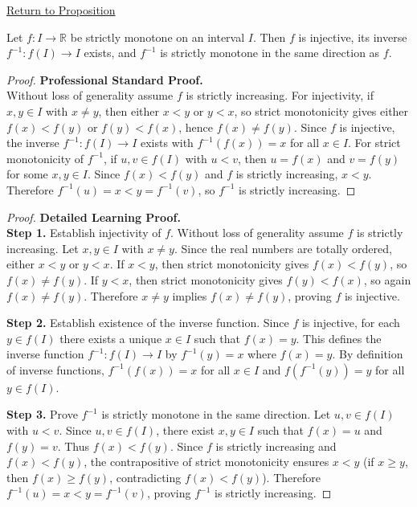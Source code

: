 \newpage
{}
\label{prf:inverse-strictly-monotone}

\begin{remark*}[Return]
\hyperref[prop:inverse-strictly-monotone]{Return to Proposition}
\end{remark*}

\begin{theorem*}
Let $f : I \to \mathbb{R}$ be strictly monotone on an interval $I$. Then $f$ is injective, its inverse $f^{-1} : f(I) \to I$ exists, and $f^{-1}$ is strictly monotone in the same direction as $f$.
\end{theorem*}

\begin{proof}
\textbf{Professional Standard Proof.}~\\
Without loss of generality assume $f$ is strictly increasing. For injectivity, if $x, y \in I$ with $x \neq y$, then either $x < y$ or $y < x$, so strict monotonicity gives either $f(x) < f(y)$ or $f(y) < f(x)$, hence $f(x) \neq f(y)$. Since $f$ is injective, the inverse $f^{-1} : f(I) \to I$ exists with $f^{-1}(f(x)) = x$ for all $x \in I$. For strict monotonicity of $f^{-1}$, if $u, v \in f(I)$ with $u < v$, then $u = f(x)$ and $v = f(y)$ for some $x, y \in I$. Since $f(x) < f(y)$ and $f$ is strictly increasing, $x < y$. Therefore $f^{-1}(u) = x < y = f^{-1}(v)$, so $f^{-1}$ is strictly increasing.
\end{proof}

\begin{proof}
\textbf{Detailed Learning Proof.}~\\

\textbf{Step 1.} Establish injectivity of $f$.
Without loss of generality assume $f$ is strictly increasing. Let $x, y \in I$ with $x \neq y$. Since the real numbers are totally ordered, either $x < y$ or $y < x$. If $x < y$, then strict monotonicity gives $f(x) < f(y)$, so $f(x) \neq f(y)$. If $y < x$, then strict monotonicity gives $f(y) < f(x)$, so again $f(x) \neq f(y)$. Therefore $x \neq y$ implies $f(x) \neq f(y)$, proving $f$ is injective.

\textbf{Step 2.} Establish existence of the inverse function.
Since $f$ is injective, for each $y \in f(I)$ there exists a unique $x \in I$ such that $f(x) = y$. This defines the inverse function $f^{-1} : f(I) \to I$ by $f^{-1}(y) = x$ where $f(x) = y$. By definition of inverse functions, $f^{-1}(f(x)) = x$ for all $x \in I$ and $f(f^{-1}(y)) = y$ for all $y \in f(I)$.

\textbf{Step 3.} Prove $f^{-1}$ is strictly monotone in the same direction.
Let $u, v \in f(I)$ with $u < v$. Since $u, v \in f(I)$, there exist $x, y \in I$ such that $f(x) = u$ and $f(y) = v$. Thus $f(x) < f(y)$. Since $f$ is strictly increasing and $f(x) < f(y)$, the contrapositive of strict monotonicity ensures $x < y$ (if $x \geq y$, then $f(x) \geq f(y)$, contradicting $f(x) < f(y)$). Therefore $f^{-1}(u) = x < y = f^{-1}(v)$, proving $f^{-1}$ is strictly increasing.
\end{proof}

